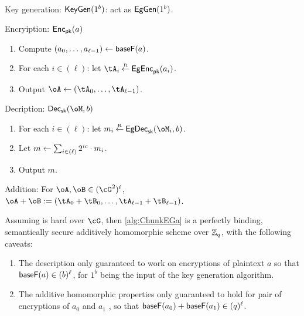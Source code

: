 \begin{algorithm}\label{alg:ChunkEGa}~
	
	\item[Key generation:] $\mathsf{KeyGen}(1^b)$: act as $\mathsf{EgGen}(1^b)$.
	
	\item[Encryiption:] $\mathsf{Enc}_{\mathsf{pk}}(a)$
	
	\begin{enumerate}
		\item Compute $(a_0,\ldots,a_{\ell-1}) \leftarrow \mathsf{baseF}(a)$.
		
		\item For each $i\in (\ell)$: let $\tA_i \getsr \EgEnc_\pk(a_i)$.
		
		\item Output $\oA \asn (\tA_0,\ldots, \tA_{\ell-1})$.
		
	\end{enumerate}
	 
	\item[Decription:] $\Dec_\sk(\oM,b)$   
	\begin{enumerate}
		\item 	 For each $i\in (\ell)$: let $m_i \getsr \EgDec_\sk(\oM_i,b)$.
		
		\item Let  $m \leftarrow \sum_{i \in (\ell)}   2^{i c} \cdot  m_i $.
		
		\item Output $m$.
	\end{enumerate}
	
	\item[Addition:] For $\oA,\oB \in (\cG^2)^\ell$, $\oA +\oB \eqdef (\tA_0+\tB_0,\ldots,\tA_{\ell-1}+\tB_{\ell-1})$.
	

	
\end{algorithm}


\begin{theorem}\label{thm:EGinExp}
	Assuming \DDH is hard over $\cG$, then \cref{alg:ChunkEGa} is  a perfectly binding,  semantically secure additively homomorphic scheme over ${\mathbb Z}_q$, with the following caveats:  
	\begin{enumerate}
		\item 	The description only guaranteed to work on encryptions of plaintext  $a$ so that $\mathsf{baseF}(a)\in (b)^\ell$,   for $1^b$ being the input of the key generation algorithm.
		
		\item The additive homomorphic  properties only guaranteed to hold for pair of encryptions of  $a_0$ and $a_1$ \resp, so that $\mathsf{baseF}(a_0)+ \mathsf{baseF}(a_1) \in (q)^\ell$.
	\end{enumerate}
\end{theorem}

